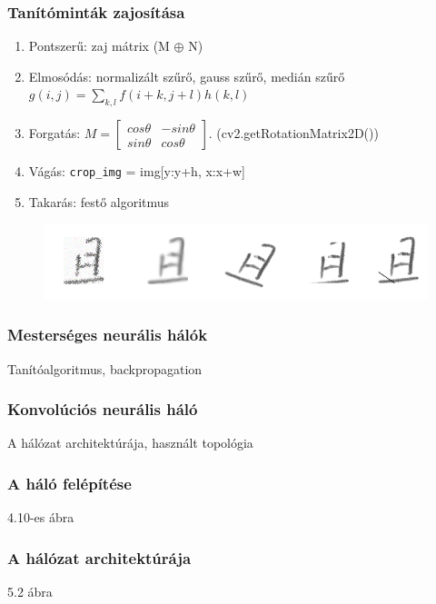 \documentclass{beamer}
\begin{document}
\begin{frame}[fragile]
\frametitle{Tanítóminták zajosítása}
\begin{enumerate}
\item Pontszerű: zaj mátrix (M $\oplus$ N)
\item Elmosódás: normalizált szűrő, gauss szűrő, medián szűrő $
g(i, j) = \sum_{k, l} f(i + k, j + l) h(k, l)
$
\item Forgatás: $
M = \begin{bmatrix} cos\theta & -sin\theta \\ sin\theta & cos\theta   \end{bmatrix}.
$ (cv2.getRotationMatrix2D())
\item Vágás: \lstinline{crop_img} = img[y:y+h, x:x+w]\lstinline{}
\item Takarás: festő algoritmus
\end{enumerate}
\begin{figure}[h]
\centering
\includegraphics[scale=0.5]{noises}
\end{figure}
\end{frame}

\begin{frame}[fragile]
\frametitle{Mesterséges neurális hálók}

Tanítóalgoritmus, backpropagation

\end{frame}

\begin{frame}[fragile]
\frametitle{Konvolúciós neurális háló}

A hálózat architektúrája, használt topológia

\end{frame}

\begin{frame}[fragile]
\frametitle{A háló felépítése}

4.10-es ábra

\end{frame}

\begin{frame}[fragile]
\frametitle{A hálózat architektúrája}

5.2 ábra

\end{frame}
\end{document}
